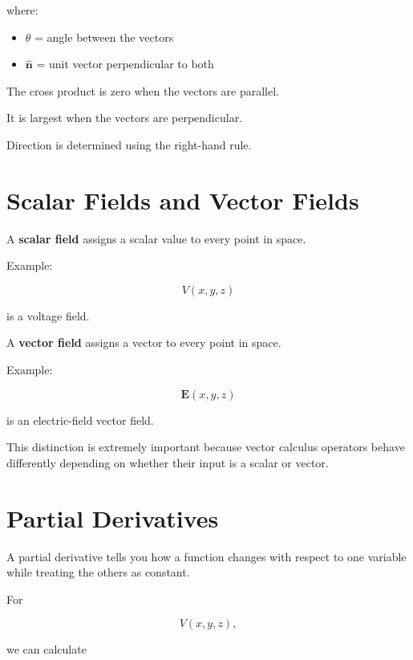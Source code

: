 \documentclass[11pt]{article}
\newcommand{\vect}[1]{\mathbf{#1}}
\begin{document}
where:

\begin{itemize}
    \item $\theta$ = angle between the vectors
    \item $\hat{\vect{n}}$ = unit vector perpendicular to both
\end{itemize}

The cross product is zero when the vectors are parallel.

It is largest when the vectors are perpendicular.

Direction is determined using the right-hand rule.



\section{Scalar Fields and Vector Fields}

A \textbf{scalar field} assigns a scalar value to every point in space.

Example:

\[
V(x,y,z)
\]

is a voltage field.

A \textbf{vector field} assigns a vector to every point in space.

Example:

\[
\vect{E}(x,y,z)
\]

is an electric-field vector field.

This distinction is extremely important because vector calculus operators behave differently depending on whether their input is a scalar or vector.



\section{Partial Derivatives}

A partial derivative tells you how a function changes with respect to one variable while treating the others as constant.

For

\[
V(x,y,z),
\]

we can calculate
\end{document}
